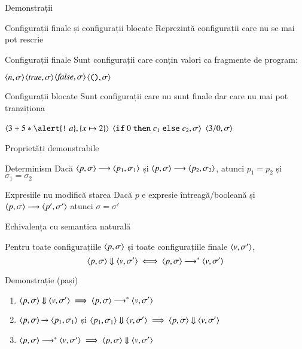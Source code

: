 \documentclass[handout,xcolor=pdftex,romanian,colorlinks]{beamer}
\begin{document}
\begin{section}{Demonstrații}
\begin{frame}{Configurații finale și configurații blocate}
Reprezintă configurații care nu se mai pot rescrie
\begin{block}{Configurații finale}
Sunt configurații care conțin valori ca fragmente de program:

\hfill $\c{n, \sigma}$\hfill $\c{\Strue, \sigma}$\hfill $\c{\Sfalse,\sigma}$\hfill $\c{\Sskip,\sigma}$\hfill\;
\end{block}

\begin{block}{Configurații blocate}
Sunt configurații care nu sunt finale dar care nu mai pot tranziționa

\hfill $\c{{3 + 5} * {\alert{\terminal{!} a}}, \{x\mapsto 2\}}$ \hfill $\c{\Sif 0 \Sthen c_1 \Selse c_2,\sigma}$ \hfill $\c{3 / 0, \sigma}$ \hfill\;
\end{block}
\end{frame}

\begin{frame}{Proprietăți demonstrabile}
\begin{block}{Determinism}  
Dacă $\c{p, \sigma}\longrightarrow \c{p_1, \sigma_1}$  și $\c{p, \sigma} \longrightarrow \c{p_2, \sigma_2}$, atunci $p_1 = p_2$ și $\sigma_1 = \sigma_2$
\end{block}


\vfill
\begin{block}{Expresiile nu modifică starea}
Dacă $p$ e expresie întreagă/booleană și $\c{p, \sigma}\longrightarrow \c{p', \sigma'}$ atunci $\sigma=\sigma'$
\end{block}
\end{frame}

\begin{frame}{Echivalența cu semantica naturală}
\begin{theorem}
Pentru toate configurațiile $\c{p,\sigma}$ și toate configurațiile finale $\c{v,\sigma'}$,
\[\S{\c{p,\sigma}}{\c{v,\sigma'}}  \iff \c{p,\sigma}\longrightarrow^\ast \c{v,\sigma'}\]
\end{theorem}

\begin{block}{Demonstrație (pași)}
\begin{enumerate}
\item $\S{\c{p,\sigma}}{\c{v,\sigma'}}  \implies \c{p,\sigma}\longrightarrow^\ast \c{v,\sigma'}$
\item $\Ss{\c{p,\sigma}}{\c{p_1,\sigma_1}}$ și $\S{\c{p_1,\sigma_1}}{\c{v,\sigma'}} \implies \S{\c{p,\sigma}}{\c{v,\sigma'}} $
\item $\c{p,\sigma} \longrightarrow^\ast{\c{v,\sigma'}} \implies \S{\c{p,\sigma}}{\c{v,\sigma'}}$
\end{enumerate}
\end{block}
\end{frame}

\end{section}
\end{document}
